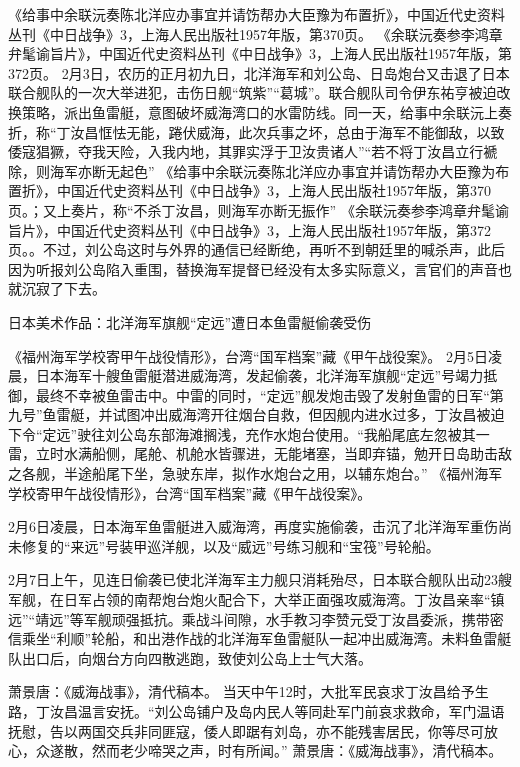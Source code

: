 \documentclass[12pt,UTF8]{ctexbook}
\begin{document}
《给事中余联沅奏陈北洋应办事宜并请饬帮办大臣豫为布置折》，中国近代史资料丛刊《中日战争》3，上海人民出版社1957年版，第370页。
《余联沅奏参李鸿章弁髦谕旨片》，中国近代史资料丛刊《中日战争》3，上海人民出版社1957年版，第372页。
2月3日，农历的正月初九日，北洋海军和刘公岛、日岛炮台又击退了日本联合舰队的一次大举进犯，击伤日舰“筑紫”“葛城”。联合舰队司令伊东祐亨被迫改换策略，派出鱼雷艇，意图破坏威海湾口的水雷防线。同一天，给事中余联沅上奏折，称“丁汝昌恇怯无能，踡伏威海，此次兵事之坏，总由于海军不能御敌，以致倭寇猖獗，夺我天险，入我内地，其罪实浮于卫汝贵诸人”“若不将丁汝昌立行褫除，则海军亦断无起色” 《给事中余联沅奏陈北洋应办事宜并请饬帮办大臣豫为布置折》，中国近代史资料丛刊《中日战争》3，上海人民出版社1957年版，第370页。；又上奏片，称“不杀丁汝昌，则海军亦断无振作” 《余联沅奏参李鸿章弁髦谕旨片》，中国近代史资料丛刊《中日战争》3，上海人民出版社1957年版，第372页。。不过，刘公岛这时与外界的通信已经断绝，再听不到朝廷里的喊杀声，此后因为听报刘公岛陷入重围，替换海军提督已经没有太多实际意义，言官们的声音也就沉寂了下去。


日本美术作品：北洋海军旗舰“定远”遭日本鱼雷艇偷袭受伤

《福州海军学校寄甲午战役情形》，台湾“国军档案”藏《甲午战役案》。
2月5日凌晨，日本海军十艘鱼雷艇潜进威海湾，发起偷袭，北洋海军旗舰“定远”号竭力抵御，最终不幸被鱼雷击中。中雷的同时，“定远”舰发炮击毁了发射鱼雷的日军“第九号”鱼雷艇，并试图冲出威海湾开往烟台自救，但因舰内进水过多，丁汝昌被迫下令“定远”驶往刘公岛东部海滩搁浅，充作水炮台使用。“我船尾底左忽被其一雷，立时水满船侧，尾舱、机舱水皆骤进，无能堵塞，当即弃锚，勉开日岛助击敌之各舰，半途船尾下坐，急驶东岸，拟作水炮台之用，以辅东炮台。” 《福州海军学校寄甲午战役情形》，台湾“国军档案”藏《甲午战役案》。

2月6日凌晨，日本海军鱼雷艇进入威海湾，再度实施偷袭，击沉了北洋海军重伤尚未修复的“来远”号装甲巡洋舰，以及“威远”号练习舰和“宝筏”号轮船。

2月7日上午，见连日偷袭已使北洋海军主力舰只消耗殆尽，日本联合舰队出动23艘军舰，在日军占领的南帮炮台炮火配合下，大举正面强攻威海湾。丁汝昌亲率“镇远”“靖远”等军舰顽强抵抗。乘战斗间隙，水手教习李赞元受丁汝昌委派，携带密信乘坐“利顺”轮船，和出港作战的北洋海军鱼雷艇队一起冲出威海湾。未料鱼雷艇队出口后，向烟台方向四散逃跑，致使刘公岛上士气大落。

萧景唐：《威海战事》，清代稿本。
当天中午12时，大批军民哀求丁汝昌给予生路，丁汝昌温言安抚。“刘公岛铺户及岛内民人等同赴军门前哀求救命，军门温语抚慰，告以两国交兵非同匪寇，倭人即踞有刘岛，亦不能残害居民，你等尽可放心，众遂散，然而老少啼哭之声，时有所闻。” 萧景唐：《威海战事》，清代稿本。
\end{document}

